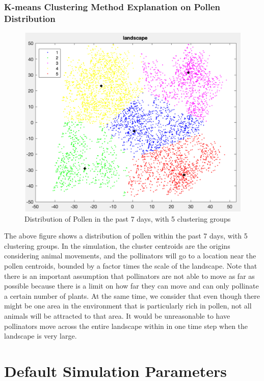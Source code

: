\documentclass[3p,,preprint,12pt]{elsarticle}
\begin{document}
\subsubsection{K-means Clustering Method Explanation on Pollen Distribution}

    \begin{figure}[!htb]
    \begin{center}
    \includegraphics[width=120mm]{figures/pollen_distribution.png}
    \caption{Distribution of Pollen in the past 7 days, with 5 clustering groups}
    \end{center}
    \end{figure}
    
The above figure shows a distribution of pollen within the past 7 days, with 5 clustering groups. In the simulation, the cluster centroids are the origins considering animal movements, and the pollinators will go to a location near the pollen centroids, bounded by a factor times the scale of the landscape. Note that there is an important assumption that pollinators are not able to move as far as possible because there is a limit on how far they can move and can only pollinate a certain number of plants. At the same time, we consider that even though there might be one area in the environment that is particularly rich in pollen, not all animals will be attracted to that area. It would be  unreasonable to have pollinators move across the entire landscape within in one time step when the landscape is very large. 
\pagebreak

\section{Default Simulation Parameters}
\end{document}
